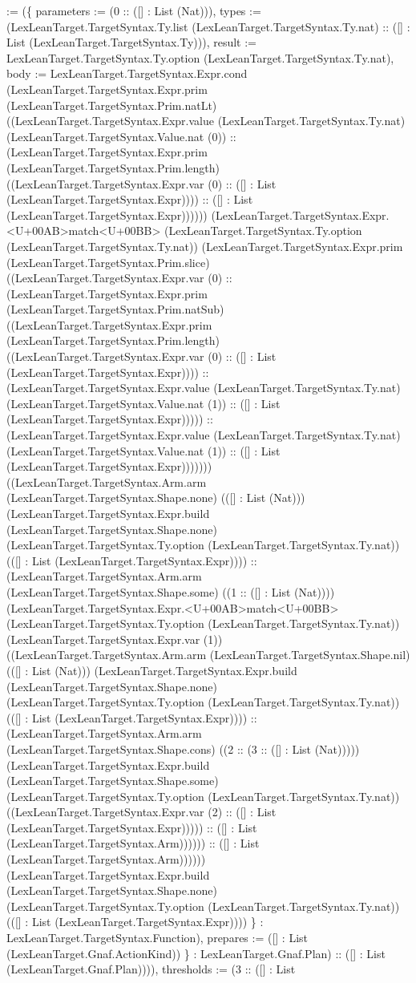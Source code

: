 \documentclass[11pt]{article}
\begin{document}
:= (\{ parameters := (0 :: ([] : List (Nat))), types := (LexLeanTarget.TargetSyntax.Ty.list (LexLeanTarget.TargetSyntax.Ty.nat) :: ([] : List (LexLeanTarget.TargetSyntax.Ty))), result := LexLeanTarget.TargetSyntax.Ty.option (LexLeanTarget.TargetSyntax.Ty.nat), body := LexLeanTarget.TargetSyntax.Expr.cond (LexLeanTarget.TargetSyntax.Expr.prim (LexLeanTarget.TargetSyntax.Prim.natLt) ((LexLeanTarget.TargetSyntax.Expr.value (LexLeanTarget.TargetSyntax.Ty.nat) (LexLeanTarget.TargetSyntax.Value.nat (0)) :: (LexLeanTarget.TargetSyntax.Expr.prim (LexLeanTarget.TargetSyntax.Prim.length) ((LexLeanTarget.TargetSyntax.Expr.var (0) :: ([] : List (LexLeanTarget.TargetSyntax.Expr)))) :: ([] : List (LexLeanTarget.TargetSyntax.Expr)))))) (LexLeanTarget.TargetSyntax.Expr.<U+00AB>match<U+00BB> (LexLeanTarget.TargetSyntax.Ty.option (LexLeanTarget.TargetSyntax.Ty.nat)) (LexLeanTarget.TargetSyntax.Expr.prim (LexLeanTarget.TargetSyntax.Prim.slice) ((LexLeanTarget.TargetSyntax.Expr.var (0) :: (LexLeanTarget.TargetSyntax.Expr.prim (LexLeanTarget.TargetSyntax.Prim.natSub) ((LexLeanTarget.TargetSyntax.Expr.prim (LexLeanTarget.TargetSyntax.Prim.length) ((LexLeanTarget.TargetSyntax.Expr.var (0) :: ([] : List (LexLeanTarget.TargetSyntax.Expr)))) :: (LexLeanTarget.TargetSyntax.Expr.value (LexLeanTarget.TargetSyntax.Ty.nat) (LexLeanTarget.TargetSyntax.Value.nat (1)) :: ([] : List (LexLeanTarget.TargetSyntax.Expr))))) :: (LexLeanTarget.TargetSyntax.Expr.value (LexLeanTarget.TargetSyntax.Ty.nat) (LexLeanTarget.TargetSyntax.Value.nat (1)) :: ([] : List (LexLeanTarget.TargetSyntax.Expr))))))) ((LexLeanTarget.TargetSyntax.Arm.arm (LexLeanTarget.TargetSyntax.Shape.none) (([] : List (Nat))) (LexLeanTarget.TargetSyntax.Expr.build (LexLeanTarget.TargetSyntax.Shape.none) (LexLeanTarget.TargetSyntax.Ty.option (LexLeanTarget.TargetSyntax.Ty.nat)) (([] : List (LexLeanTarget.TargetSyntax.Expr)))) :: (LexLeanTarget.TargetSyntax.Arm.arm (LexLeanTarget.TargetSyntax.Shape.some) ((1 :: ([] : List (Nat)))) (LexLeanTarget.TargetSyntax.Expr.<U+00AB>match<U+00BB> (LexLeanTarget.TargetSyntax.Ty.option (LexLeanTarget.TargetSyntax.Ty.nat)) (LexLeanTarget.TargetSyntax.Expr.var (1)) ((LexLeanTarget.TargetSyntax.Arm.arm (LexLeanTarget.TargetSyntax.Shape.nil) (([] : List (Nat))) (LexLeanTarget.TargetSyntax.Expr.build (LexLeanTarget.TargetSyntax.Shape.none) (LexLeanTarget.TargetSyntax.Ty.option (LexLeanTarget.TargetSyntax.Ty.nat)) (([] : List (LexLeanTarget.TargetSyntax.Expr)))) :: (LexLeanTarget.TargetSyntax.Arm.arm (LexLeanTarget.TargetSyntax.Shape.cons) ((2 :: (3 :: ([] : List (Nat))))) (LexLeanTarget.TargetSyntax.Expr.build (LexLeanTarget.TargetSyntax.Shape.some) (LexLeanTarget.TargetSyntax.Ty.option (LexLeanTarget.TargetSyntax.Ty.nat)) ((LexLeanTarget.TargetSyntax.Expr.var (2) :: ([] : List (LexLeanTarget.TargetSyntax.Expr))))) :: ([] : List (LexLeanTarget.TargetSyntax.Arm)))))) :: ([] : List (LexLeanTarget.TargetSyntax.Arm)))))) (LexLeanTarget.TargetSyntax.Expr.build (LexLeanTarget.TargetSyntax.Shape.none) (LexLeanTarget.TargetSyntax.Ty.option (LexLeanTarget.TargetSyntax.Ty.nat)) (([] : List (LexLeanTarget.TargetSyntax.Expr)))) \} : LexLeanTarget.TargetSyntax.Function), prepares := ([] : List (LexLeanTarget.Gnaf.ActionKind)) \} : LexLeanTarget.Gnaf.Plan) :: ([] : List (LexLeanTarget.Gnaf.Plan)))), thresholds := (3 :: ([] : List 
\end{document}
